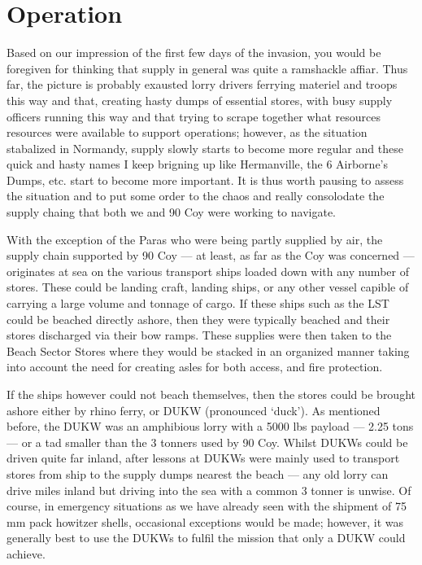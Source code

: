 \documentclass[noraggedright]{turabian-researchpaper}
\begin{document}
\section{Operation } %

Based on our impression of the first few days of the invasion, you would be 
foregiven for thinking that supply in general was quite a ramshackle affiar.
Thus far, the picture is probably exausted lorry drivers ferrying materiel and
troops this way and that, creating hasty dumps of essential stores, with busy
supply officers running this way and that trying to scrape together what 
resources resources were available to support operations; however, as the
situation stabalized in Normandy, supply slowly starts to become more regular
and these quick and hasty names I keep brigning up like Hermanville, the
6 Airborne's Dumps, etc. start to become more important.  It is thus
worth pausing to assess the situation and to put some order to the chaos and
really consolodate the supply chaing that both we and 90 Coy were working to 
navigate. 

With the exception of the Paras who were being partly supplied by air, the
supply chain supported by 90 Coy --- at least, as far as the Coy was concerned
--- originates at sea on the various transport ships loaded down with any 
number of stores.  These could be landing craft, landing ships, or any other
vessel capible of carrying a large volume and tonnage of cargo.  If these
ships such as the LST could be beached directly ashore, then they were 
typically beached and their stores discharged via their bow ramps.  These 
supplies were then taken to the Beach Sector Stores where they would be 
stacked in an organized manner taking into account the need for creating
asles for both access, and fire protection.  

If the ships however could not beach themselves, then the stores could be
brought ashore either by rhino ferry, or DUKW (pronounced `duck').  As 
mentioned before, the DUKW was an amphibious lorry with a 5000 lbs 
payload --- 2.25 tons --- or a tad smaller than the 3 tonners used by 90 Coy.
Whilst DUKWs could be driven quite far inland, after lessons at %
DUKWs were mainly used to transport stores from ship to the supply
dumps nearest the beach --- any old lorry can drive miles inland but driving
into the sea with a common 3 tonner is unwise.  Of course, in emergency 
situations as we have already seen with the shipment of 75 mm pack howitzer
shells, occasional exceptions would be made; however, it was generally best
to use the DUKWs to fulfil the mission that only a DUKW could achieve.
\end{document}
